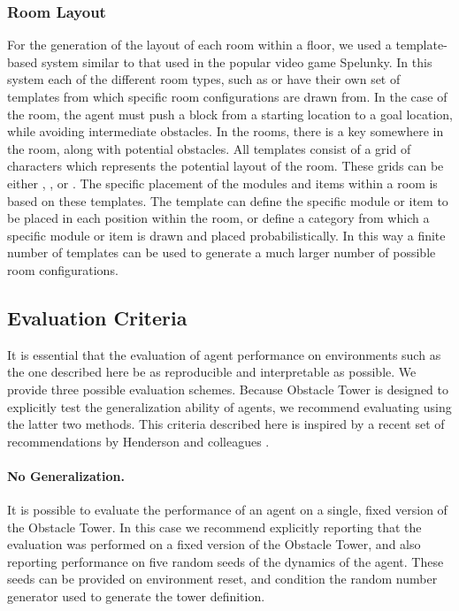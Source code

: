 \documentclass{article}
\begin{document}
\subsubsection{Room Layout} For the generation of the layout of each room within a floor, we used a template-based system similar to that used in the popular video game Spelunky. In this system each of the different room types, such as  or  have their own set of templates from which specific room configurations are drawn from. In the case of the  room, the agent must push a block from a starting location to a goal location, while avoiding intermediate obstacles. In the  rooms, there is a key somewhere in the room, along with potential obstacles. All templates consist of a grid of characters which represents the potential layout of the room. These grids can be either , , or . The specific placement of the modules and items within a room is based on these templates. The template can define the specific module or item to be placed in each position within the room, or define a category from which a specific module or item is drawn and placed probabilistically. In this way a finite number of templates can be used to generate a much larger number of possible room configurations. 

\subsection{Evaluation Criteria} 

It is essential that the evaluation of agent performance on environments such as the one described here be as reproducible and interpretable as possible. We provide three possible evaluation schemes. Because Obstacle Tower is designed to explicitly test the generalization ability of agents, we recommend evaluating using the latter two methods. This criteria described here is inspired by a recent set of recommendations by Henderson and colleagues \cite{henderson2017deep}. 

\paragraph{No Generalization.} It is possible to evaluate the performance of an agent on a single, fixed version of the Obstacle Tower. In this case we recommend explicitly reporting that the evaluation was performed on a fixed version of the Obstacle Tower, and also reporting performance on five random seeds of the dynamics of the agent. These seeds can be provided on environment reset, and condition the random number generator used to generate the tower definition.
\end{document}
